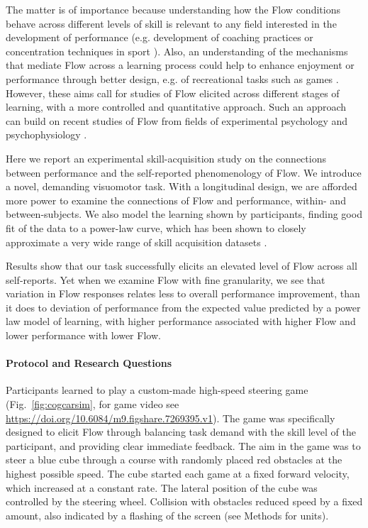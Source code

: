 \documentclass{frontierstyle/frontiersSCNS}
\newcommand{\hl}{\textcolor{red!80}}
\begin{document}
The matter is of importance because understanding how the Flow conditions behave across different levels of skill is relevant to any field interested in the development of performance (e.g. development of coaching practices or concentration techniques in sport \citep{Jackson1996}). Also, an understanding of the mechanisms that mediate Flow across a learning process could help to enhance enjoyment or performance through better design, e.g. of recreational tasks such as games \citep{Chen2007}. However, these aims call for studies of Flow elicited across different stages of learning, with a more controlled and quantitative approach. Such an approach can build on recent studies of Flow from fields of experimental psychology \citep{Harris2017,Keller2008} and psychophysiology \citep{Peifer2012,Peifer2014,Wolf2015,Harmat2015,Labonte-LeMoyne2016}.

Here we report an experimental skill-acquisition study on the connections between performance and the self-reported phenomenology of Flow. We introduce a novel, demanding visuomotor task. With a longitudinal design, we are afforded more power to examine the connections of Flow and performance, within- and between-subjects. \hl{We also model the learning shown by participants, finding good fit of the data to a power-law curve, which has been shown to closely approximate a very wide range of skill acquisition datasets \citep{Newell1982,Logan1988automatize,Palmeri1999powerlaw}.}

Results show that our task successfully elicits an elevated level of Flow across all self-reports. Yet when we examine Flow with fine granularity, we see that variation in Flow responses relates less to overall performance improvement, than it does to deviation of performance from the expected value predicted by a power law model of learning, with higher performance associated with higher Flow and lower performance with lower Flow.


\paragraph*{Protocol and Research Questions}

Participants learned to play a custom-made high-speed steering game (Fig.~\ref{fig:cogcarsim}, for game video see \url{https://doi.org/10.6084/m9.figshare.7269395.v1}). The game was specifically designed to elicit Flow through balancing task demand with the skill level of the participant, and providing clear immediate feedback. The aim in the game was to steer a blue cube through a course with randomly placed red obstacles at the highest possible speed. The cube started each game at a fixed forward velocity, which increased at a constant rate. The lateral position of the cube was controlled by the steering wheel. Collision with obstacles reduced speed by a fixed amount, also indicated by a flashing of the screen (see Methods for units).
\end{document}
